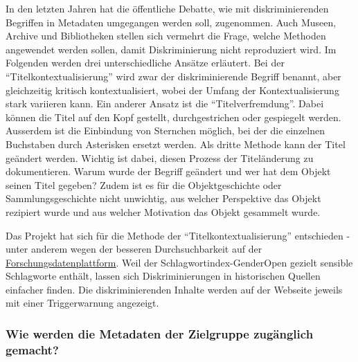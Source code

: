 \documentclass[
  nswissgerman,
  letterpaper,
  DIV=11,
  numbers=noendperiod]{scrartcl}
\begin{document}
In den letzten Jahren hat die öffentliche Debatte, wie mit
diskriminierenden Begriffen in Metadaten umgegangen werden soll,
zugenommen. Auch Museen, Archive und Bibliotheken stellen sich vermehrt
die Frage, welche Methoden angewendet werden sollen, damit
Diskriminierung nicht reproduziert wird. Im Folgenden werden drei
unterschiedliche Ansätze erläutert. Bei der ``Titelkontextualisierung''
wird zwar der diskriminierende Begriff benannt, aber gleichzeitig
kritisch kontextualisiert, wobei der Umfang der Kontextualisierung stark
variieren kann. Ein anderer Ansatz ist die ``Titelverfremdung''. Dabei
können die Titel auf den Kopf gestellt, durchgestrichen oder gespiegelt
werden. Ausserdem ist die Einbindung von Sternchen möglich, bei der die
einzelnen Buchstaben durch Asterisken ersetzt werden. Als dritte Methode
kann der Titel geändert werden. Wichtig ist dabei, diesen Prozess der
Titeländerung zu dokumentieren. Warum wurde der Begriff geändert und wer
hat dem Objekt seinen Titel gegeben? Zudem ist es für die
Objektgeschichte oder Sammlungsgeschichte nicht unwichtig, aus welcher
Perspektive das Objekt rezipiert wurde und aus welcher Motivation das
Objekt gesammelt wurde.

\begin{tcolorbox}[enhanced jigsaw, arc=.35mm, bottomrule=.15mm, bottomtitle=1mm, breakable, colback=white, colbacktitle=quarto-callout-tip-color!10!white, colframe=quarto-callout-tip-color-frame, coltitle=black, left=2mm, leftrule=.75mm, opacityback=0, opacitybacktitle=0.6, rightrule=.15mm, title=\textcolor{quarto-callout-tip-color}{\faLightbulb}\hspace{0.5em}{Erfahrungen der Stadt.Geschichte.Basel}, titlerule=0mm, toprule=.15mm, toptitle=1mm]

Das Projekt hat sich für die Methode der ``Titelkontextualisierung''
entschieden - unter anderem wegen der besseren Durchsuchbarkeit auf der
\href{https://forschung.stadtgeschichtebasel.ch/}{Forschungsdatenplattform}.
Weil der Schlagwortindex-GenderOpen gezielt sensible Schlagworte
enthält, lassen sich Diskriminierungen in historischen Quellen einfacher
finden. Die diskriminierenden Inhalte werden auf der Webseite jeweils
mit einer Triggerwarnung angezeigt.

\end{tcolorbox}

\subsubsection{Wie werden die Metadaten der Zielgruppe zugänglich
gemacht?}\label{wie-werden-die-metadaten-der-zielgruppe-zuguxe4nglich-gemacht}
\end{document}
